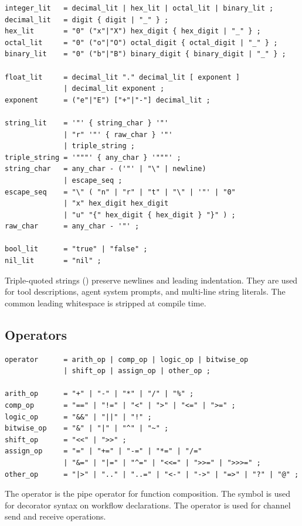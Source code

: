\begin{lstlisting}[language=EBNF]
integer_lit   = decimal_lit | hex_lit | octal_lit | binary_lit ;
decimal_lit   = digit { digit | "_" } ;
hex_lit       = "0" ("x"|"X") hex_digit { hex_digit | "_" } ;
octal_lit     = "0" ("o"|"O") octal_digit { octal_digit | "_" } ;
binary_lit    = "0" ("b"|"B") binary_digit { binary_digit | "_" } ;

float_lit     = decimal_lit "." decimal_lit [ exponent ]
              | decimal_lit exponent ;
exponent      = ("e"|"E") ["+"|"-"] decimal_lit ;

string_lit    = '"' { string_char } '"'
              | "r" '"' { raw_char } '"'
              | triple_string ;
triple_string = '"""' { any_char } '"""' ;
string_char   = any_char - ('"' | "\" | newline)
              | escape_seq ;
escape_seq    = "\" ( "n" | "r" | "t" | "\" | '"' | "0"
              | "x" hex_digit hex_digit
              | "u" "{" hex_digit { hex_digit } "}" ) ;
raw_char      = any_char - '"' ;

bool_lit      = "true" | "false" ;
nil_lit       = "nil" ;
\end{lstlisting}

\begin{note}
Triple-quoted strings () preserve newlines and leading indentation. They are used for tool descriptions, agent system prompts, and multi-line string literals. The common leading whitespace is stripped at compile time.
\end{note}

\subsection{Operators}

\begin{lstlisting}[language=EBNF]
operator      = arith_op | comp_op | logic_op | bitwise_op
              | shift_op | assign_op | other_op ;

arith_op      = "+" | "-" | "*" | "/" | "%" ;
comp_op       = "==" | "!=" | "<" | ">" | "<=" | ">=" ;
logic_op      = "&&" | "||" | "!" ;
bitwise_op    = "&" | "|" | "^" | "~" ;
shift_op      = "<<" | ">>" ;
assign_op     = "=" | "+=" | "-=" | "*=" | "/="
              | "&=" | "|=" | "^=" | "<<=" | ">>=" | ">>>=" ;
other_op      = "|>" | ".." | "..=" | "<-" | "->" | "=>" | "?" | "@" ;
\end{lstlisting}

\begin{note}
The \code{|>} operator is the pipe operator for function composition. The  symbol is used for decorator syntax on workflow declarations. The \code{<-} operator is used for channel send and receive operations.
\end{note}

